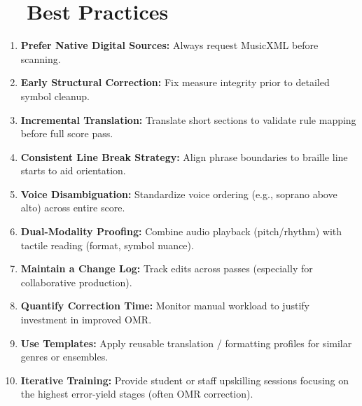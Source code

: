 \section{~~Best Practices}\label{ch10:sec:best-practices}
\begin{enumerate}
	\item \textbf{Prefer Native Digital Sources:} Always request \gls{MusicXML} before scanning.
	\item \textbf{Early Structural Correction:} Fix measure integrity prior to detailed symbol cleanup.
	\item \textbf{Incremental Translation:} Translate short sections to validate rule mapping before full score pass.
	\item \textbf{Consistent Line Break Strategy:} Align phrase boundaries to braille line starts to aid orientation.
	\item \textbf{Voice Disambiguation:} Standardize voice ordering (e.g., soprano above alto) across entire score.
	\item \textbf{Dual-Modality Proofing:} Combine audio playback (pitch/rhythm) with tactile reading (format, symbol nuance).
	\item \textbf{Maintain a Change Log:} Track edits across passes (especially for collaborative production).
	\item \textbf{Quantify Correction Time:} Monitor manual workload to justify investment in improved \gls{OMR}.
	\item \textbf{Use Templates:} Apply reusable translation / formatting profiles for similar genres or ensembles.
	\item \textbf{Iterative Training:} Provide student or staff upskilling sessions focusing on the highest error-yield stages (often OMR correction).
\end{enumerate}

